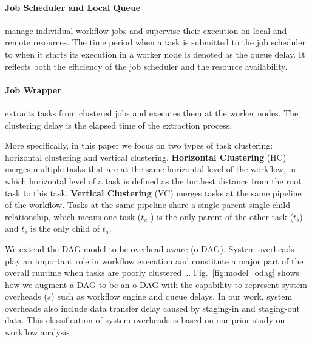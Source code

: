 \paragraph{Job Scheduler and Local Queue} manage individual workflow jobs and supervise their execution on local and remote resources. The time period when a task is submitted to the job scheduler to when it starts its execution in a worker node is denoted as the queue delay. It reflects both the efficiency of the job scheduler and the resource availability. 

\paragraph{Job Wrapper} extracts tasks from clustered jobs and executes them at the worker nodes. The clustering delay is the  elapsed time of the extraction process.

More specifically, in this paper we focus on two types of task clustering: horizontal clustering and vertical clustering. \textbf{Horizontal Clustering} (HC) merges multiple tasks that are at the same horizontal level of the workflow, in which horizontal level of a task is defined as the furthest distance from the root task to this task. \textbf{Vertical Clustering} (VC) merges tasks at the same pipeline of the workflow. Tasks at the same pipeline share a single-parent-single-child relationship, which means one task ($t_a$ ) is the only parent of the other task ($t_b$) and $t_b$ is the only child of $t_a$. 

We extend the DAG model to be overhead aware (o-DAG). System overheads play an important role in workflow execution and constitute a major part of the overall runtime when tasks are poorly clustered~\cite{Chen2011}.. Fig.~\ref{fig:model_odag} shows how we augment a DAG to be an o-DAG with the capability to represent system overheads ($s$) such as workflow engine and queue delays. In our work, system overheads also include data transfer delay caused by staging-in and staging-out data. This classification of system overheads is based on our prior study on workflow analysis~\cite{Chen2011}. 

